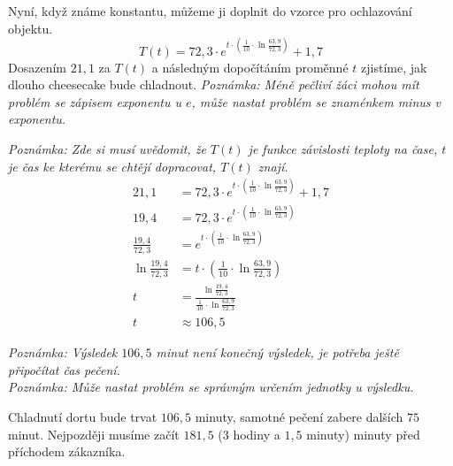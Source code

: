 \documentclass[12pt,a4paper,addpoints]{article}
\begin{document}
    Nyní, když známe konstantu, můžeme ji doplnit do vzorce pro ochlazování objektu.
    $$T(t) = 72,3 \cdot \textit{e}^{t \cdot (\frac{1}{10} \cdot \ln{\frac{63,9}{72,3}})} + 1,7$$
    Dosazením $21,1$ za $T(t)$ a následným dopočítáním proměnné $t$ zjistíme, jak dlouho cheesecake bude chladnout.
    \textit{Poznámka: Méně pečliví žáci mohou mít problém se zápisem exponentu u $e$, může nastat problém se znaménkem minus v exponentu.}

    \textit{Poznámka: Zde si musí uvědomit, že $T(t)$ je funkce závislosti teploty na čase, $t$ je čas ke kterému se chtějí dopracovat, $T(t)$ znají.}
    \begin{align*}
        21,1 &= 72,3 \cdot \textit{e}^{t \cdot (\frac{1}{10} \cdot \ln{\frac{63,9}{72,3}})} + 1,7\\
        19,4 &= 72,3 \cdot \textit{e}^{t \cdot (\frac{1}{10} \cdot \ln{\frac{63,9}{72,3}})}\\
        \frac{19,4}{72,3} &= \textit{e}^{t \cdot (\frac{1}{10} \cdot \ln{\frac{63,9}{72,3}})}\\
        \ln{\frac{19,4}{72,3}} &= t \cdot (\frac{1}{10} \cdot \ln{\frac{63,9}{72,3}})\\
        t &= \frac{\ln{\frac{19,4}{72,3}}}{\frac{1}{10} \cdot \ln{\frac{63,9}{72,3}}}\\
        t &\approx 106,5
    \end{align*}


    \textit{Poznámka: Výsledek $106,5$ minut není konečný výsledek, je potřeba ještě připočítat čas pečení.}\\
    \textit{Poznámka: Může nastat problém se správným určením jednotky u výsledku.}

    Chladnutí dortu bude trvat $106,5$ minuty, samotné pečení zabere dalších $75$ minut. Nejpozději musíme začít $181,5$ ($3$ hodiny a $1,5$ minuty) minuty před příchodem zákazníka.
\end{document}
